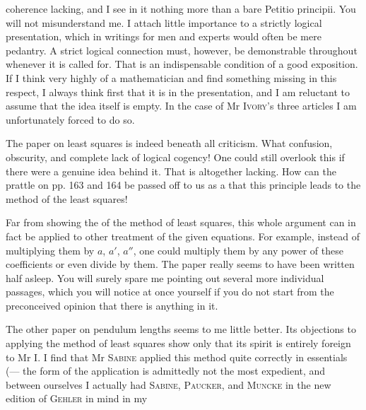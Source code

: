 coherence lacking, and I see in it nothing more than a bare Petitio principii. You will not misunderstand me. I attach little importance to a strictly logical presentation, which in writings for men and experts would often be mere pedantry. A strict logical connection must, however, be demonstrable throughout whenever it is called for. That is an indispensable condition of a good exposition. If I think very highly of a mathematician and find something missing in this respect, I always think first that it is  in the presentation, and I am reluctant to assume that the idea itself is empty. In the case of Mr \textsc{Ivory}'s three articles I am unfortunately forced to do so.

The paper on least squares is indeed beneath all criticism. What confusion, obscurity, and complete lack of logical cogency! One could still overlook this if there were a genuine idea behind it. That is altogether lacking. How can the prattle on pp. 163 and 164 be passed off to us as a  that this principle leads  to the method of the least squares!

Far from showing the  of the method of least squares, this whole argument can in fact be applied to  other treatment of the given equations. For example, instead of multiplying them by $a$, $a'$, $a''$, one could multiply them by any power of these coefficients or even divide by them. The paper really seems to have been written half asleep. You will surely spare me pointing out several more individual passages, which you will notice at once yourself if you do not start from the preconceived opinion that there is anything in it.

The other paper on pendulum lengths seems to me little better. Its objections to applying the method of least squares show only that its spirit is entirely foreign to Mr I. I find that Mr \textsc{Sabine} applied this method quite correctly in essentials (— the form of the application is admittedly not the most expedient, and between ourselves I actually had \textsc{Sabine}, \textsc{Paucker}, and \textsc{Muncke} in the new edition of \textsc{Gehler} in mind in my
